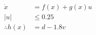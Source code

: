 \documentclass[preview]{standalone}
\begin{document}
\begin{align*}
\dot x &= f(x) + g(x) u\\ |u| &\leq 0.25\\ \therefore h(x) &= d - 1.8 v
\end{align*}
\end{document}
